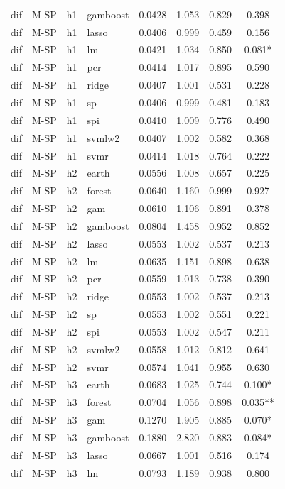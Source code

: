 \begin{ThreePartTable}
\begin{longtable}[t]{llclcccc}
dif & M-SP & h1 & gamboost & 0.0428 & 1.053 & 0.829 & 0.398\\
dif & M-SP & h1 & lasso & 0.0406 & 0.999 & 0.459 & 0.156\\
dif & M-SP & h1 & lm & 0.0421 & 1.034 & 0.850 & 0.081*\\
dif & M-SP & h1 & pcr & 0.0414 & 1.017 & 0.895 & 0.590\\
dif & M-SP & h1 & ridge & 0.0407 & 1.001 & 0.531 & 0.228\\
dif & M-SP & h1 & sp & 0.0406 & 0.999 & 0.481 & 0.183\\
dif & M-SP & h1 & spi & 0.0410 & 1.009 & 0.776 & 0.490\\
dif & M-SP & h1 & svmlw2 & 0.0407 & 1.002 & 0.582 & 0.368\\
dif & M-SP & h1 & svmr & 0.0414 & 1.018 & 0.764 & 0.222\\
\addlinespace
dif & M-SP & h2 & earth & 0.0556 & 1.008 & 0.657 & 0.225\\
dif & M-SP & h2 & forest & 0.0640 & 1.160 & 0.999 & 0.927\\
dif & M-SP & h2 & gam & 0.0610 & 1.106 & 0.891 & 0.378\\
dif & M-SP & h2 & gamboost & 0.0804 & 1.458 & 0.952 & 0.852\\
dif & M-SP & h2 & lasso & 0.0553 & 1.002 & 0.537 & 0.213\\
dif & M-SP & h2 & lm & 0.0635 & 1.151 & 0.898 & 0.638\\
dif & M-SP & h2 & pcr & 0.0559 & 1.013 & 0.738 & 0.390\\
dif & M-SP & h2 & ridge & 0.0553 & 1.002 & 0.537 & 0.213\\
dif & M-SP & h2 & sp & 0.0553 & 1.002 & 0.551 & 0.221\\
dif & M-SP & h2 & spi & 0.0553 & 1.002 & 0.547 & 0.211\\
dif & M-SP & h2 & svmlw2 & 0.0558 & 1.012 & 0.812 & 0.641\\
dif & M-SP & h2 & svmr & 0.0574 & 1.041 & 0.955 & 0.630\\
\addlinespace
dif & M-SP & h3 & earth & 0.0683 & 1.025 & 0.744 & 0.100*\\
dif & M-SP & h3 & forest & 0.0704 & 1.056 & 0.898 & 0.035**\\
dif & M-SP & h3 & gam & 0.1270 & 1.905 & 0.885 & 0.070*\\
dif & M-SP & h3 & gamboost & 0.1880 & 2.820 & 0.883 & 0.084*\\
dif & M-SP & h3 & lasso & 0.0667 & 1.001 & 0.516 & 0.174\\
dif & M-SP & h3 & lm & 0.0793 & 1.189 & 0.938 & 0.800\\

\end{longtable}
\end{ThreePartTable}
